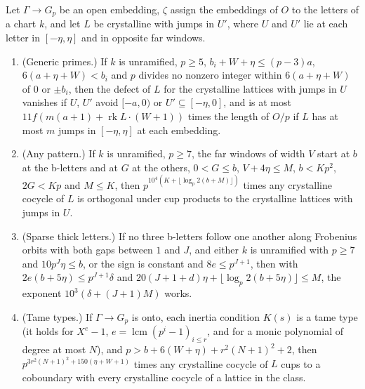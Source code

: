 \begin{theorem}\label{thm:cup-exponents}
Let $\Gamma\to G_p$ be an open embedding, $\zeta$ assign the embeddings of $O$ to the letters of a chart $k$, and let $L$ be crystalline with jumps in $U'$, where $U$ and $U'$ lie at each letter in $[-\eta,\eta]$ and in opposite far
windows.
\begin{enumerate}[label=\textup{(\alph*)}]
\item (Generic primes.) If $k$ is unramified, $p\ge5$, $b_i+W+\eta\le(p-3)a$, $6(a+\eta+W)<b_i$ and $p$ divides no nonzero integer within $6(a+\eta+W)$ of $0$ or $\pm b_i$, then the defect of $L$ for the crystalline lattices with jumps in $U$
vanishes if $U$, $U'$ avoid $[-a,0)$ or $U'\subseteq[-\eta,0]$, and is at most $11f(m(a+1)+\operatorname{rk}L\cdot(W+1))$ times the length of $O/p$ if $L$ has at most $m$ jumps in $[-\eta,\eta]$ at each embedding.
\item (Any pattern.) If $k$ is unramified, $p\ge7$, the far windows of width $V$ start at $b$ at the b-letters and at $G$ at the others, $0<G\le b$, $V+4\eta\le M$, $b<Kp^2$, $2G<Kp$ and $M\le K$, then $p^{10^4(K+\lfloor\log_p2(b+M)\rfloor)}$ times
any crystalline cocycle of $L$ is orthogonal under cup products to the crystalline lattices with jumps in $U$.
\item (Sparse thick letters.) If no three b-letters follow one another along Frobenius orbits with both gaps between $1$ and $J$, and either $k$ is unramified with $p\ge7$ and $10p^J\eta\le b$, or the sign is constant and
$8e\le p^{J+1}$, then with $2e(b+5\eta)\le p^{J+1}\delta$ and $20(J+1+d)\eta+\lfloor\log_p2(b+5\eta)\rfloor\le M$, the exponent $10^3(\delta+(J+1)M)$ works.
\item (Tame types.) If $\Gamma\to G_p$ is onto, each inertia condition $K(s)$ is a tame type (it holds for $X^{e}-1$, $e=\operatorname{lcm}(p^i-1)_{i\le r}$, and for a monic polynomial of degree at most $N$), and
$p>b+6(W+\eta)+r^2(N+1)^2+2$, then $p^{3r^2(N+1)^2+150(\eta+W+1)}$ times any crystalline cocycle of $L$ cups to a coboundary with every crystalline cocycle of a lattice in the class.
\end{enumerate}
\end{theorem}

